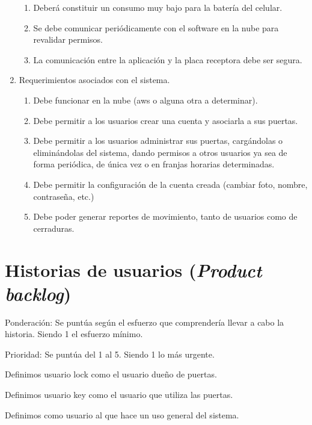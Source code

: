 \documentclass[11pt]{charter}
\begin{document}
\begin{enumerate}
\begin{enumerate}
	\item Deberá constituir un consumo muy bajo para la batería del celular.
	\item Se debe comunicar periódicamente con el software en la nube para revalidar permisos.
	\item La comunicación entre la aplicación y la placa receptora debe ser segura.
	\end{enumerate}
\item Requerimientos asociados con el sistema.
	\begin{enumerate}
	\item Debe funcionar en la nube (aws o alguna otra a determinar).
	\item Debe permitir a los usuarios crear una cuenta y asociarla a sus puertas.
	\item Debe permitir a los usuarios administrar sus puertas, cargándolas o eliminándolas del sistema, dando permisos a otros usuarios ya sea de forma periódica, de única vez o en franjas horarias determinadas.
	\item Debe permitir la configuración de la cuenta creada (cambiar foto, nombre, contraseña, etc.)
	\item Debe poder generar reportes de movimiento, tanto de usuarios como de cerraduras.
	\end{enumerate}
\end{enumerate}


\section{Historias de usuarios (\textit{Product backlog})}
\label{sec:backlog}

Ponderación: Se puntúa según el esfuerzo que comprendería llevar a cabo la historia. Siendo 1 el esfuerzo mínimo.

Prioridad: Se puntúa del 1 al 5. Siendo 1 lo más urgente.

Definimos usuario lock como el usuario dueño de puertas.

Definimos usuario key como el usuario que utiliza las puertas.

Definimos como usuario al que hace un uso general del sistema.
\end{document}
